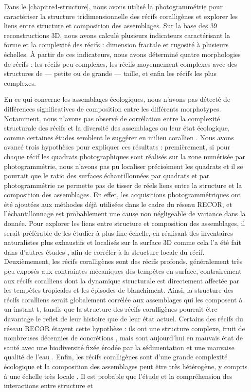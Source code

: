 Dans le \autoref{chapitre4-structure}, nous avons utilisé la photogrammétrie pour caractériser la structure tridimensionnelle des récifs coralligènes et explorer les liens entre structure et composition des assemblages. Sur la base des 39 reconstructions 3D, nous avons calculé plusieurs indicateurs caractérisant la forme et la complexité des récifs : dimension fractale et rugosité à plusieurs échelles. À partir de ces indicateurs, nous avons déterminé quatre morphologies de récifs : les récifs peu complexes, les récifs moyennement complexes avec des structures de — petite ou de grande — taille, et enfin les récifs les plus complexes. 

En ce qui concerne les assemblages écologiques, nous n’avons pas détecté de différences significatives de composition entre les différents morphotypes. Notamment, nous n’avons pas observé de corrélation entre la complexité structurale des récifs et la diversité des assemblages ou leur état écologique, comme certaines études semblent le suggérer en milieu corallien \citep{darling_relationships_2017, burns_3d_2019, price_using_2019, carlot_community_2020}. Nous avons avancé trois hypothèses pour expliquer ces résultats : premièrement, si pour chaque récif les quadrats photographiques sont réalisés sur la zone numérisée par photogrammétrie, nous n’avons pas pu localiser précisément les quadrats et il se pourrait que le ratio des surfaces échantillonnées par quadrats et par photogrammétrie ne permette pas de tisser de réels liens entre la structure et la composition des assemblages. En effet, les acquisitions photogrammétriques ont été ajoutées aux méthodes déjà utilisées dans le cadre du réseau RECOR, et l’échantillonnage est probablement une cause non négligeable de variance dans la donnée. Pour explorer les liens entre structure et composition des assemblages, il serait préférable de les étudier à plus fine échelle, en réalisant des inventaires naturalistes plus exhaustifs et localisés sur la surface 3D comme cela l’a été fait dans d’autres études \citep{price_using_2019}, afin de corréler à la structure locale du récif. Deuxièmement, les récifs coralligènes sont des récifs profonds, généralement très peu exposés aux contraintes mécaniques des tempêtes en surface, contrairement aux récifs coralliens dont la dynamique structurale est directement affectée par les tempêtes tropicales et les épisodes de blanchiment. Ainsi, la structure des récifs coralliens serait globalement corrélée aux assemblages qui les composent à un instant t, tandis que la structure des récifs coralligènes pourrait être davantage le reflet de leur histoire que de leur état actuel. Certains des récifs du réseau RECOR étayent cette hypothèse : ils ont une structure complexe, fruit de nombreuses décennies de concrétions \citep{sartoretto_age_1996}, mais sont aujourd’hui en mauvais état de santé avec une biodiversité fixée érodée par la sédimentation et une mauvaise qualité de l’eau \citep{airoldi_effects_2003, holon_predictive_2018}. Enfin, les récifs coralligènes sont d’une grande complexité écologique et la composition des assemblages peut être très hétérogène, y compris à une échelle très locale \citep{kipson_rapid_2011}. Il est probable que l’étude et la compréhension des interactions entre structure et 